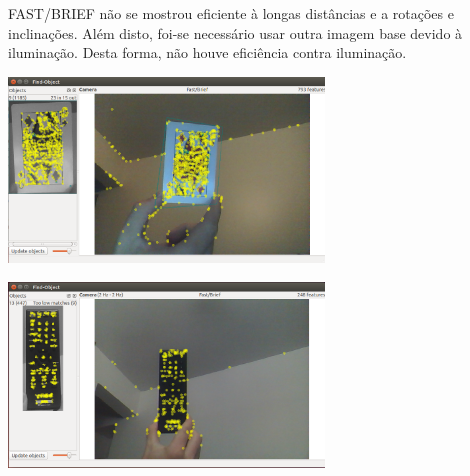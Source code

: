 \documentclass[conference]{IEEEtran}
\begin{document}
\vspace{1.2\baselineskip}\vspace{-\parskip} 
\raggedright
\nobreak\hspace{.16667em plus .08333em} 
 FAST/BRIEF n\~ao se mostrou eficiente \`a longas dist\^ancias e a rota\c{c}\~oes e inclina\c{c}\~oes. Al\'em disto, foi-se 
 necess\'ario usar outra imagem base devido \`a ilumina\c{c}\~ao. Desta forma, n\~ao houve efici\^encia contra ilumina\c{c}\~ao.

 		\vspace{2\baselineskip}\vspace{-\parskip}
 		\begin{minipage}{\linewidth}
 		\centering
 		\includegraphics[width=3.3in]{carta1perto}
 		\end{minipage}	
 
		\vspace{2\baselineskip}\vspace{-\parskip}
 		\begin{minipage}{\linewidth}
 		\centering
 		\includegraphics[width=3.3in]{controle1longe}
 		\end{minipage}	
 
 \vspace{1.2\baselineskip}\vspace{-\parskip} 
\end{document}
